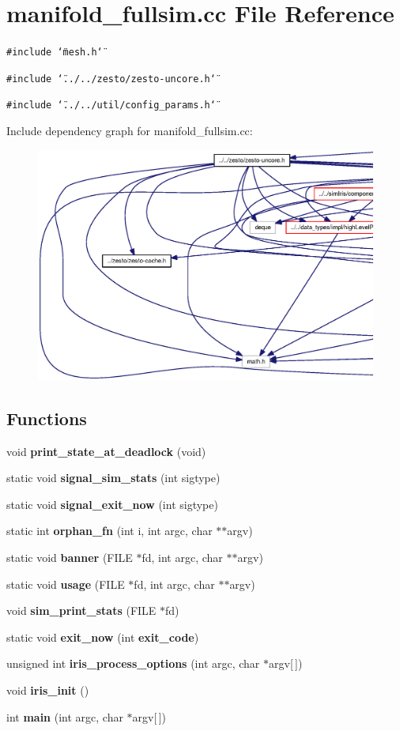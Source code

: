 \section{manifold\_\-fullsim.cc File Reference}
\label{manifold__fullsim_8cc}
{\tt \#include \char`\"{}mesh.h\char`\"{}}\par
{\tt \#include \char`\"{}../../zesto/zesto-uncore.h\char`\"{}}\par
{\tt \#include \char`\"{}../../util/config\_\-params.h\char`\"{}}\par


Include dependency graph for manifold\_\-fullsim.cc:\nopagebreak
\begin{figure}[H]
\begin{center}
\leavevmode
\includegraphics[width=420pt]{manifold__fullsim_8cc__incl}
\end{center}
\end{figure}
\subsection*{Functions}
\begin{CompactItemize}
\item 
void {\bf print\_\-state\_\-at\_\-deadlock} (void)
\item 
static void {\bf signal\_\-sim\_\-stats} (int sigtype)
\item 
static void {\bf signal\_\-exit\_\-now} (int sigtype)
\item 
static int {\bf orphan\_\-fn} (int i, int argc, char $\ast$$\ast$argv)
\item 
static void {\bf banner} (FILE $\ast$fd, int argc, char $\ast$$\ast$argv)
\item 
static void {\bf usage} (FILE $\ast$fd, int argc, char $\ast$$\ast$argv)
\item 
void {\bf sim\_\-print\_\-stats} (FILE $\ast$fd)
\item 
static void {\bf exit\_\-now} (int {\bf exit\_\-code})
\item 
unsigned int {\bf iris\_\-process\_\-options} (int argc, char $\ast$argv[$\,$])
\item 
void {\bf iris\_\-init} ()
\item 
int {\bf main} (int argc, char $\ast$argv[$\,$])
\end{CompactItemize}
